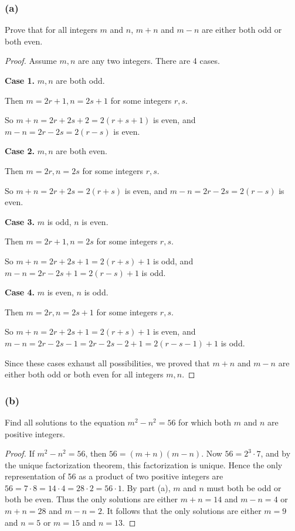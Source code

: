 \documentclass[14pt]{extarticle}
\begin{document}
\subsubsection{(a)}
Prove that for all integers $m$ and $n$, $m + n$ and $m - n$ are either both odd or both even.

\begin{proof}
Assume $m,n$ are any two integers. There are 4 cases.

{\bf Case 1.} $m,n$ are both odd.

Then $m = 2r+1, n = 2s+1$ for some integers $r,s$. 

So $m+n = 2r + 2s + 2 = 2(r+s+1)$ is even, and $m-n = 2r - 2s = 2(r-s)$ is even.

{\bf Case 2.} $m,n$ are both even.

Then $m = 2r, n = 2s$ for some integers $r,s$.

So $m+n = 2r + 2s  = 2(r+s)$ is even, and $m-n = 2r - 2s = 2(r-s)$ is even.

{\bf Case 3.} $m$ is odd, $n$ is even.

Then $m = 2r+1, n = 2s$ for some integers $r,s$.

So $m+n = 2r + 2s + 1 = 2(r+s) +1$ is odd, and $m-n = 2r - 2s + 1 = 2(r-s) + 1$ is odd.

{\bf Case 4.} $m$ is even, $n$ is odd.

Then $m = 2r, n = 2s+1$ for some integers $r,s$.

So $m+n = 2r + 2s + 1 = 2(r+s)+1$ is even, and $m-n = 2r - 2s - 1 = 2r - 2s - 2 + 1 = 2(r-s - 1) + 1$ is odd.

Since these cases exhaust all possibilities, we proved that $m+n$ and $m-n$ are either both odd or both even for all integers $m,n$.
\end{proof}

\subsubsection{(b)}
Find all solutions to the equation $m^2 - n^2 = 56$ for which both $m$ and $n$ are positive integers.

\begin{proof}
If $m^2 - n^2 = 56$, then $56 = (m + n)(m - n)$. Now $56 = 2^3 \cdot 7$, and by the unique factorization theorem, this factorization is unique. Hence the only representation of 56 as a product of two positive integers are $56 = 7\cdot8 = 14\cdot4 = 28\cdot2 = 56\cdot1$. By part (a), $m$ and $n$ must both be odd or both be even. Thus the only solutions are either $m + n = 14$ and $m - n = 4$ or $m + n = 28$ and $m - n = 2$. It follows that the only solutions are either $m = 9$ and $n = 5$ or $m = 15$ and $n = 13$.
\end{proof}
\end{document}

